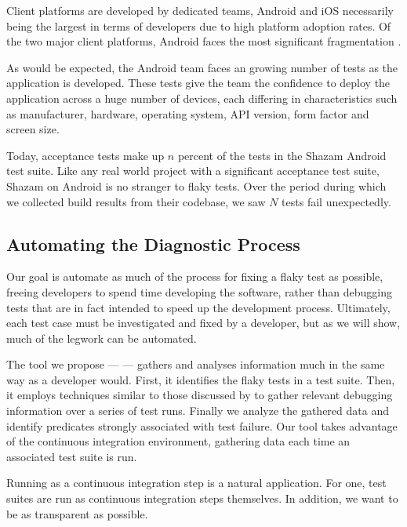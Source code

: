 Client platforms are developed by dedicated teams, Android and iOS necessarily being the largest in terms of developers due to high platform adoption rates. Of the two major client platforms, Android faces the most significant fragmentation \cite{AndroidFragmentationVisualized}.

As would be expected, the Android team faces an growing number of tests as the application is developed.  These tests give the team the confidence to deploy the application across a huge number of devices, each differing in characteristics such as manufacturer, hardware, operating system, API version, form factor and screen size.

Today, acceptance tests make up $n$ percent of the tests in the Shazam Android test suite. Like any real world project with a significant acceptance test suite, Shazam on Android is no stranger to flaky tests. Over the period  during which we collected build results from their codebase, we saw $N$ tests fail unexpectedly.


\subsection{Automating the Diagnostic Process}

Our goal is automate as much of the process for fixing a flaky test as possible, freeing developers to spend time developing the software, rather than debugging tests that are in fact intended to speed up the development process. Ultimately, each test case must be investigated and fixed by a developer, but as we will show, much of the legwork can be automated.

The tool we propose --- \emph{\splatter} --- gathers and analyses information much in the same way as a developer would. First, it identifies the flaky tests in a test suite. Then, it employs techniques similar to those discussed by \citet{ArumugaNainar:2010:ABI:1806799.1806839} to gather relevant debugging information over a series of test runs. Finally we analyze the gathered data and identify predicates strongly associated with test failure. Our tool takes advantage of the continuous integration environment, gathering data each time an associated test suite is run.

Running as a continuous integration step is a natural application. For one, test suites are run as continuous integration steps themselves. In addition, we want to be as transparent as possible.

